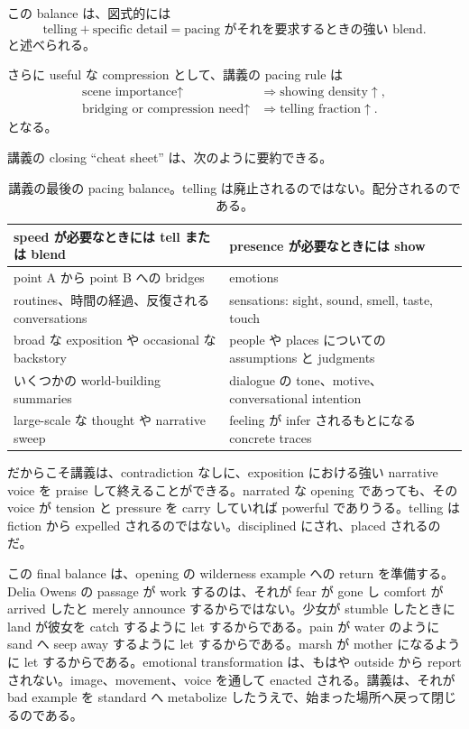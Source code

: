 この balance は、図式的には
\begin{equation}
\text{telling} + \text{specific detail} = \text{pacing がそれを要求するときの強い blend}.
\end{equation}
と述べられる。

さらに useful な compression として、講義の pacing rule は
\begin{align}
\text{scene importance} \uparrow &\Rightarrow \text{showing density} \uparrow,\\
\text{bridging or compression need} \uparrow &\Rightarrow \text{telling fraction} \uparrow.
\end{align}
となる。

講義の closing ``cheat sheet'' は、次のように要約できる。

\begin{table}[h]
\centering
\begin{tabular}{|p{}|p{}|}
\hline
\textbf{speed が必要なときには tell または blend} & \textbf{presence が必要なときには show} \\
\hline
point A から point B への bridges & emotions \\
\hline
routines、時間の経過、反復される conversations & sensations: sight, sound, smell, taste, touch \\
\hline
broad な exposition や occasional な backstory & people や places についての assumptions と judgments \\
\hline
いくつかの world-building summaries & dialogue の tone、motive、conversational intention \\
\hline
large-scale な thought や narrative sweep & feeling が infer されるもとになる concrete traces \\
\hline
\end{tabular}
\caption{講義の最後の pacing balance。telling は廃止されるのではない。配分されるのである。}
\end{table}

だからこそ講義は、contradiction なしに、exposition における強い narrative voice を praise して終えることができる。narrated な opening であっても、その voice が tension と pressure を carry していれば powerful でありうる。telling は fiction から expelled されるのではない。disciplined にされ、placed されるのだ。

この final balance は、opening の wilderness example への return を準備する。Delia Owens の passage が work するのは、それが fear が gone し comfort が arrived したと merely announce するからではない。少女が stumble したときに land が彼女を catch するように let するからである。pain が water のように sand へ seep away するように let するからである。marsh が mother になるように let するからである。emotional transformation は、もはや outside から report されない。image、movement、voice を通して enacted される。講義は、それが bad example を standard へ metabolize したうえで、始まった場所へ戻って閉じるのである。


